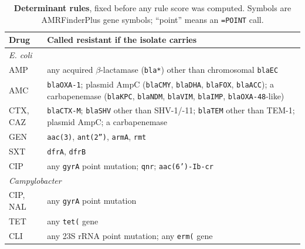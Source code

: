 \begin{table}[t]\centering\small
\caption{\textbf{Determinant rules}, fixed before any rule score was computed. Symbols are
AMRFinderPlus gene symbols; ``point'' means an \texttt{=POINT} call.}\label{tab:rule}
\begin{tabularx}{\linewidth}{lX}
\toprule
Drug & Called resistant if the isolate carries \\
\midrule
\multicolumn{2}{l}{\textit{E. coli}} \\
AMP & any acquired $\beta$-lactamase (\texttt{bla*}) other than chromosomal \texttt{blaEC} \\
AMC & \texttt{blaOXA-1}; plasmid AmpC (\texttt{blaCMY}, \texttt{blaDHA}, \texttt{blaFOX}, \texttt{blaACC}); a carbapenemase (\texttt{blaKPC}, \texttt{blaNDM}, \texttt{blaVIM}, \texttt{blaIMP}, \texttt{blaOXA-48}-like) \\
CTX, CAZ & \texttt{blaCTX-M}; \texttt{blaSHV} other than SHV-1/-11; \texttt{blaTEM} other than TEM-1; plasmid AmpC; a carbapenemase \\
GEN & \texttt{aac(3)}, \texttt{ant(2'')}, \texttt{armA}, \texttt{rmt} \\
SXT & \texttt{dfrA}, \texttt{dfrB} \\
CIP & any \texttt{gyrA} point mutation; \texttt{qnr}; \texttt{aac(6')-Ib-cr} \\
\midrule
\multicolumn{2}{l}{\textit{Campylobacter} \cite{zhao2016campylobacter,iovine2013campylobacter}} \\
CIP, NAL & any \texttt{gyrA} point mutation \\
TET & any \texttt{tet(} gene \\
CLI & any 23S rRNA point mutation; any \texttt{erm(} gene \\
\bottomrule
\end{tabularx}
\end{table}

